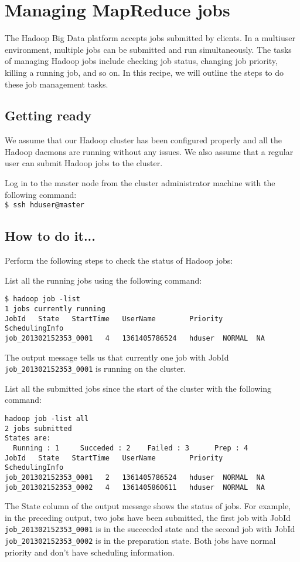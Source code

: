 \section{Managing MapReduce jobs}
The Hadoop Big Data platform accepts jobs submitted by clients. In a multiuser environment, multiple jobs can be submitted and run simultaneously. The tasks of managing Hadoop jobs include checking job status, changing job priority, killing a running job, and so on. In this recipe, we will outline the steps to do these job management tasks.
\subsection*{Getting ready}
We assume that our Hadoop cluster has been configured properly and all the Hadoop daemons are running without any issues. We also assume that a regular user can submit Hadoop jobs to the cluster.

Log in to the master node from the cluster administrator machine with the following command:\\
\verb|$ ssh hduser@master|
\subsection*{How to do it...}
Perform the following steps to check the status of Hadoop jobs:

List all the running jobs using the following command: 
\begin{verbatim}
$ hadoop job -list
1 jobs currently running
JobId   State   StartTime   UserName        Priority        SchedulingInfo
job_201302152353_0001   4   1361405786524   hduser  NORMAL  NA
\end{verbatim}

The output message tells us that currently one job with JobId \verb|job_201302152353_0001| is running on the cluster.

List all the submitted jobs since the start of the cluster with the following command: 
\begin{verbatim}
hadoop job -list all
2 jobs submitted
States are:
  Running : 1     Succeded : 2    Failed : 3      Prep : 4
JobId   State   StartTime   UserName        Priority        SchedulingInfo
job_201302152353_0001   2   1361405786524   hduser  NORMAL  NA
job_201302152353_0002   4   1361405860611   hduser  NORMAL  NA
\end{verbatim}

The State column of the output message shows the status of jobs. For example, in the preceding output, two jobs have been submitted, the first job with JobId \verb|job_201302152353_0001| is in the succeeded state and the second job with JobId \verb|job_201302152353_0002| is in the preparation state. Both jobs have normal priority and don't have scheduling information.

